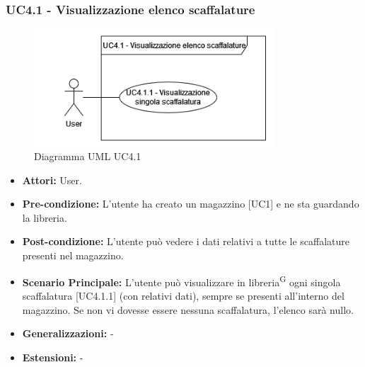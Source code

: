 \subsubsection{UC4.1 - Visualizzazione elenco scaffalature}
\begin{figure}[H]
  \centering
  \includegraphics[width=0.8\textwidth]{UC_diagrams_1-10/UC4.1.drawio.png}
   \caption{Diagramma UML UC4.1}
\end{figure}
\begin{itemize}
    \item \textbf{Attori:} User.
    \item \textbf{Pre-condizione:}  L'utente ha creato un magazzino [UC1] e ne sta guardando la libreria.
    \item \textbf{Post-condizione:} L'utente può vedere i dati relativi a tutte le scaffalature presenti nel magazzino.
    \item \textbf{Scenario Principale:} L'utente può visualizzare in libreria\textsuperscript{G} ogni singola scaffalatura [UC4.1.1] (con relativi dati), sempre se presenti all'interno del magazzino. Se non vi dovesse essere nessuna scaffalatura, l'elenco sarà nullo.
    \item \textbf{Generalizzazioni:} -
    \item \textbf{Estensioni:} -
\end{itemize}


